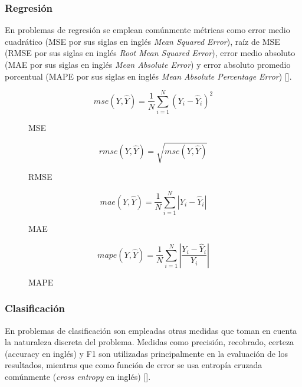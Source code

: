 \subsubsection{Regresión}

En problemas de regresión se emplean comúnmente
métricas como error medio cuadrático (MSE por sus siglas en inglés \emph{Mean Squared Error}), 
raíz de MSE (RMSE por sus siglas en inglés \emph{Root Mean Squared Error}),
error medio absoluto (MAE por sus siglas en inglés \emph{Mean Absolute Error}) y error absoluto promedio porcentual 
(MAPE por sus siglas en inglés \emph{Mean Absolute Percentage Error}) [\cite{botchkarev2019new}].

\begin{figure}
	\begin{equation}\label{metric:MSE}
		mse(Y, \hat{Y}) = \frac{1}{N} \sum^{N}_{i=1} (Y_i - \hat{Y}_i)^2
	\end{equation}
	\caption{MSE}
\end{figure}

\begin{figure}
	\begin{equation}\label{metric:RMSE}
		rmse(Y, \hat{Y}) = \sqrt{mse(Y, \hat{Y})}
	\end{equation}
	\caption{RMSE}
\end{figure}

\begin{figure}
	\begin{equation}\label{metric:MAE}
		mae(Y, \hat{Y}) = \frac{1}{N} \sum^{N}_{i=1} |Y_i - \hat{Y}_i|
	\end{equation}
	\caption{MAE}
\end{figure}

\begin{figure}
	\begin{equation}\label{metric:MAPE}
		mape(Y, \hat{Y}) = \frac{1}{N} \sum^{N}_{i=1} |\frac{Y_i - \hat{Y}_i}{Y_i}|
	\end{equation}
	\caption{MAPE}
\end{figure}

\subsubsection{Clasificación}

En problemas de clasificación son empleadas otras medidas que toman en cuenta la naturaleza discreta del problema. 
Medidas como precisión, recobrado, certeza (accuracy en inglés) y F1 son utilizadas principalmente en la 
evaluación de los resultados, mientras que como función de error se usa entropía cruzada comúnmente 
(\emph{cross entropy} en inglés) [\cite{grandini2020metrics}].


